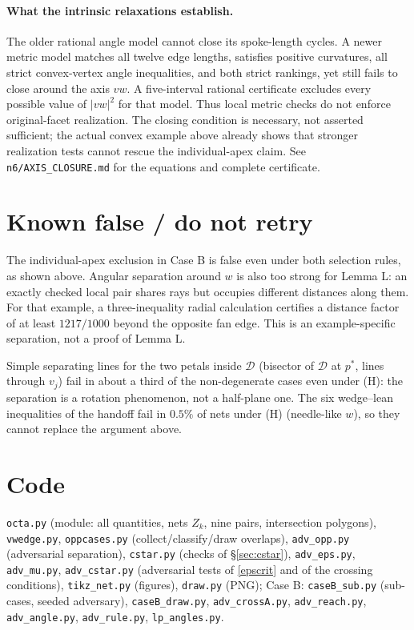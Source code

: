 \documentclass[11pt]{article}
\theoremstyle{definition}
\theoremstyle{remark}
\newcommand{\D}{\mathcal{D}}
\begin{document}
\paragraph{What the intrinsic relaxations establish.}
The older rational angle model cannot close its spoke-length cycles. A newer
metric model matches all twelve edge lengths, satisfies positive curvatures,
all strict convex-vertex angle inequalities, and both strict rankings, yet
still fails to close around the axis $vw$. A five-interval rational certificate
excludes every possible value of $|vw|^2$ for that model. Thus local metric
checks do not enforce original-facet realization. The closing condition is
necessary, not asserted sufficient; the actual convex example above already
shows that stronger realization tests cannot rescue the individual-apex claim.
See \texttt{n6/AXIS\_CLOSURE.md} for the equations and complete certificate.

\section{Known false / do not retry}
The individual-apex exclusion in Case B is false even under both selection
rules, as shown above. Angular separation around $w$ is also too strong for
Lemma L: an exactly checked local pair shares rays but occupies different
distances along them. For that example, a three-inequality radial calculation
certifies a distance factor of at least $1217/1000$ beyond the opposite fan
edge. This is an example-specific separation, not a proof of Lemma L.

Simple separating lines for the two petals inside $\D$ (bisector of $\D$ at $p^*$, lines through $v_j$) fail
in about a third of the non-degenerate cases even under (H): the separation is a rotation phenomenon, not a
half-plane one. The six wedge--lean inequalities of the handoff fail in $0.5\%$ of nets under (H) (needle-like
$w$), so they cannot replace the argument above.

\section*{Code}
\begingroup\small
\texttt{octa.py} (module: all quantities, nets $Z_k$, nine pairs, intersection polygons),
\texttt{vwedge.py}, \texttt{oppcases.py} (collect/classify/draw overlaps), \texttt{adv\_opp.py} (adversarial
separation), \texttt{cstar.py} (checks of \S\ref{sec:cstar}), \texttt{adv\_eps.py}, \texttt{adv\_mu.py},
\texttt{adv\_cstar.py} (adversarial tests of \eqref{epscrit} and of the crossing conditions),
\texttt{tikz\_net.py} (figures), \texttt{draw.py} (PNG); Case B: \texttt{caseB\_sub.py} (sub-cases, seeded adversary), \texttt{caseB\_draw.py}, \texttt{adv\_crossA.py}, \texttt{adv\_reach.py}, \texttt{adv\_angle.py}, \texttt{adv\_rule.py}, \texttt{lp\_angles.py}.
\endgroup
\end{document}
